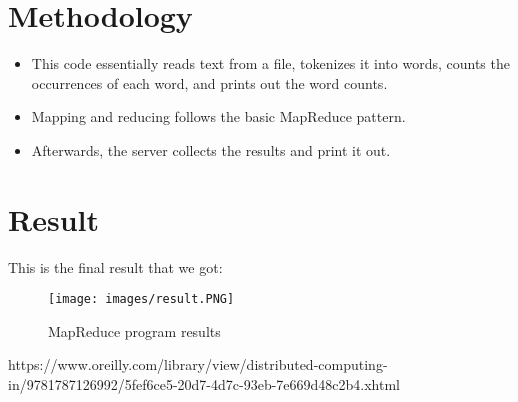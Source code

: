 \documentclass[]{article}
\begin{document}
\section{Methodology}
\begin{itemize}
    \item This code essentially reads text from a file, tokenizes it into words, counts the occurrences of each word, and prints out the word counts. 
    \item Mapping and reducing follows the basic MapReduce pattern. 
    \item Afterwards, the server collects the results and print it out.
\end{itemize}

\section{Result}
\noindent%
This is the final result that we got:
\begin{figure}[h]
    \centering
    \texttt{[image: images/result.PNG]}
    \caption{MapReduce program results}
    \label{fig:protocol}
\end{figure}

\begin{thebibliography}{9}
https://www.oreilly.com/library/view/distributed-computing-in/9781787126992/5fef6ce5-20d7-4d7c-93eb-7e669d48c2b4.xhtml
\end{thebibliography}
\end{document}
